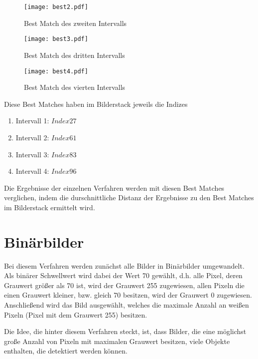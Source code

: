 \begin{figure}[H]
  \begin{center}
    \texttt{[image: best2.pdf]}
    \caption{Best Match des zweiten Intervalls}
    \label{fig:bestmatch2}
  \end{center}
\end{figure}

\begin{figure}[H]
  \begin{center}
    \texttt{[image: best3.pdf]}
    \caption{Best Match des dritten Intervalls}
    \label{fig:bestmatch3}
  \end{center}
\end{figure}

\begin{figure}[H]
  \begin{center}
    \texttt{[image: best4.pdf]}
    \caption{Best Match des vierten Intervalls}
    \label{fig:bestmatch4}
  \end{center}
\end{figure}

Diese Best Matches haben im Bilderstack jeweils die Indizes
\begin{enumerate}
	\item{Intervall 1: $Index 27$}
	\item{Intervall 2: $Index 61$}
	\item{Intervall 3: $Index 83$}
	\item{Intervall 4: $Index 96$}
\end{enumerate}

Die Ergebnisse der einzelnen Verfahren werden mit diesen Best Matches verglichen, indem die durschnittliche Distanz der Ergebnisse zu den Best Matches im Bilderstack ermittelt wird. 

\section{Binärbilder}
Bei diesem Verfahren werden zunächst alle Bilder in Binärbilder umgewandelt. Als binärer Schwellwert wird dabei der Wert 70 gewählt, d.h. alle Pixel, deren Grauwert größer als 70 ist, wird der Grauwert 255 zugewiesen, allen Pixeln die einen Grauwert kleiner, bzw. gleich 70 besitzen, wird der Grauwert 0 zugewiesen. Anschließend wird das Bild ausgewählt, welches die maximale Anzahl an weißen Pixeln (Pixel mit dem Grauwert 255) besitzen.

Die Idee, die hinter diesem Verfahren steckt, ist, dass Bilder, die eine möglichst große Anzahl von Pixeln mit maximalen Grauwert besitzen, viele Objekte enthalten, die detektiert werden können. \\
\newpage
